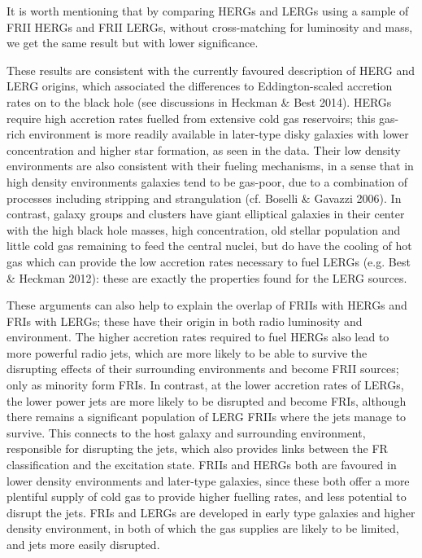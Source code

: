 \documentclass[usenatbib]{mn2e}
\begin{document}
It is worth mentioning that by comparing HERGs and LERGs using a sample of
FRII HERGs and FRII LERGs, without cross-matching for luminosity and mass,
we get the same result but with lower significance.

These results are consistent with the currently favoured description of
HERG and LERG origins, which associated the differences to
Eddington-scaled accretion rates on to the black hole (see discussions in
Heckman \& Best 2014). HERGs require high accretion rates fuelled from
extensive cold gas reservoirs; this gas-rich environment is more readily
available in later-type disky galaxies with lower concentration and higher
star formation, as seen in the data. Their low density environments are
also consistent with their fueling mechanisms, in a sense that in high
density environments galaxies tend to be gas-poor, due to a combination of
processes including stripping and strangulation (cf. Boselli \& Gavazzi
2006). In contrast, galaxy groups and clusters have giant elliptical
galaxies in their center with the high black hole masses, high
concentration, old stellar population and little cold gas remaining to
feed the central nuclei, but do have the cooling of hot gas which can
provide the low accretion rates necessary to fuel LERGs (e.g. Best \&
Heckman 2012): these are exactly the properties found for the LERG
sources.

These arguments can also help to explain the overlap of FRIIs with HERGs
and FRIs with LERGs; these have their origin in both radio luminosity and
environment. The higher accretion rates required to fuel HERGs also lead
to more powerful radio jets, which are more likely to be able to survive
the disrupting effects of their surrounding environments and become FRII
sources; only as minority form FRIs. In contrast, at the lower accretion
rates of LERGs, the lower power jets are more likely to be disrupted and
become FRIs, although there remains a significant population of LERG FRIIs
where the jets manage to survive. This connects to the host galaxy and
surrounding environment, responsible for disrupting the jets, which also
provides links between the FR classification and the excitation
state. FRIIs and HERGs both are favoured in lower density environments and
later-type galaxies, since these both offer a more plentiful supply of
cold gas to provide higher fuelling rates, and less potential to disrupt
the jets. FRIs and LERGs are developed in early type galaxies and higher
density environment, in both of which the gas supplies are likely to be
limited, and jets more easily disrupted.
\end{document}
